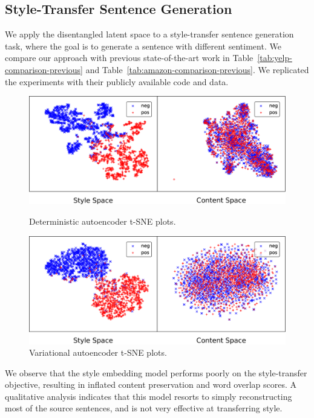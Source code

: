 \documentclass[letterpaper]{article} %
\begin{document}
\subsection{Style-Transfer Sentence Generation}

We apply the disentangled latent space to a style-transfer sentence generation task, where the goal is to generate a sentence with different sentiment.
We compare our approach with previous state-of-the-art work in Table~\ref{tab:yelp-comparison-previous} and Table~\ref{tab:amazon-comparison-previous}.
We replicated the experiments with their publicly available code and data.

\begin{figure}[ht]
	\captionsetup{justification=centering}

	\includegraphics[width=\linewidth]{dae-latent-spaces}
	\caption{Deterministic autoencoder t-SNE plots.}
	\label{fig:dae-tsne}

	\includegraphics[width=\linewidth]{vae-latent-spaces}
	\caption{Variational autoencoder t-SNE plots.}
	\label{fig:vae-tsne}
\end{figure}

We observe that the style embedding model \cite{fu2017style} performs poorly on the style-transfer objective, resulting in inflated content preservation and word overlap scores.
A qualitative analysis indicates that this model resorts to simply reconstructing most of the source sentences, and is not very effective at transferring style.
\end{document}
